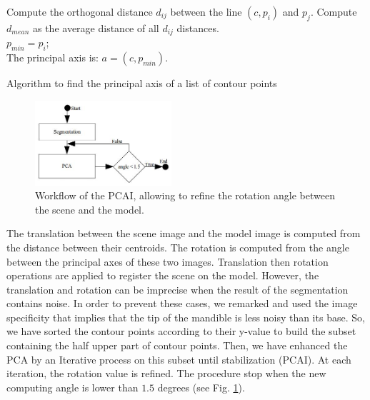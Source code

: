 \documentclass[twoside,twocolumn,10pt]{article}
\begin{document}
\begin{algorithm}
	{
		{
			{
				Compute the orthogonal distance $d_{ij}$ between the line $(c,p_i)$ and $p_j$.
			}
		}
		Compute $d_{mean}$ as the average distance of all $d_{ij}$ distances.\\

		{
			$p_{min} = p_i$;\\
		}
	}
	The principal axis is: $a = (c,p_{min})$.
	\caption{Algorithm to find the principal axis of a list of contour points}
	\label{alg1}
\end{algorithm}

\begin{figure}[htbp]
    \centering
    \includegraphics[width=0.45\textwidth]{./images/pcadiagram}
    \caption{Workflow of the PCAI, allowing to refine the rotation angle between the scene and the model.}
    \label{fig:pcai}
\end{figure}

The translation between the scene image and the model image is computed from the distance between their centroids.
The rotation is computed from the angle between the principal axes of these two images.
Translation then rotation operations are applied to register the scene on the model.
However, the translation and rotation can be imprecise when the result of the segmentation contains noise.
In order to prevent these cases, we remarked and used the image specificity that implies that the tip of the mandible is less noisy than its base.
So, we have sorted the contour points according to their y-value to build the subset containing the half upper part of contour points.
Then, we have enhanced the PCA by an Iterative process on this subset until stabilization (PCAI).
At each iteration, the rotation value is refined.
The procedure stop when the new computing angle is lower than $1.5$ degrees (see Fig. \ref{fig:pcai}).
\end{document}
